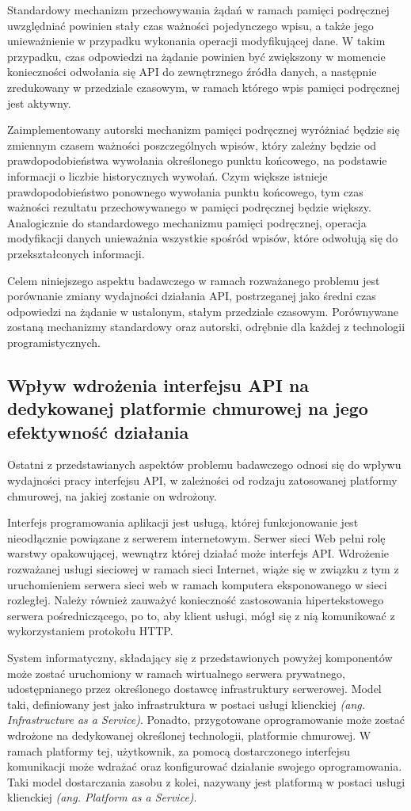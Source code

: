 Standardowy mechanizm przechowywania żądań w ramach pamięci podręcznej uwzględniać powinien stały czas ważności pojedynczego wpisu, a także jego unieważnienie w przypadku wykonania operacji modyfikującej dane. W takim przypadku, czas odpowiedzi na żądanie powinien być zwiększony w momencie konieczności odwołania się API do zewnętrznego źródła danych, a następnie zredukowany w przedziale czasowym, w ramach którego wpis pamięci podręcznej jest aktywny.

Zaimplementowany autorski mechanizm pamięci podręcznej wyróżniać będzie się zmiennym czasem ważności poszczególnych wpisów, który zależny będzie od prawdopodobieństwa wywołania określonego punktu końcowego, na podstawie informacji o liczbie historycznych wywołań. Czym większe istnieje prawdopodobieństwo ponownego wywołania punktu końcowego, tym czas ważności rezultatu przechowywanego w pamięci podręcznej będzie większy. Analogicznie do standardowego mechanizmu pamięci podręcznej, operacja modyfikacji danych unieważnia wszystkie spośród wpisów, które odwołują się do przekształconych informacji.

Celem niniejszego aspektu badawczego w ramach rozważanego problemu jest porównanie zmiany wydajności działania API, postrzeganej jako średni czas odpowiedzi na żądanie w ustalonym, stałym przedziale czasowym. Porównywane zostaną mechanizmy standardowy oraz autorski, odrębnie dla każdej z technologii programistycznych.
\subsection*{Wpływ wdrożenia interfejsu API na dedykowanej platformie chmurowej na jego efektywność działania}
Ostatni z przedstawianych aspektów problemu badawczego odnosi się do wpływu wydajności pracy interfejsu API, w zależności od rodzaju zatosowanej platformy chmurowej, na jakiej zostanie on wdrożony.

Interfejs programowania aplikacji jest usługą, której funkcjonowanie jest nieodłącznie powiązane z serwerem internetowym. Serwer sieci Web pełni rolę warstwy opakowującej, wewnątrz której działać może interfejs API. Wdrożenie rozważanej usługi sieciowej w ramach sieci Internet, wiąże się w związku z tym z uruchomieniem serwera sieci web w ramach komputera eksponowanego w sieci rozległej. Należy również zauważyć konieczność zastosowania hipertekstowego serwera pośredniczącego, po to, aby klient usługi, mógł się z nią komunikować z wykorzystaniem protokołu HTTP.

System informatyczny, składający się z przedstawionych powyżej komponentów może zostać uruchomiony w ramach wirtualnego serwera prywatnego, udostępnianego przez określonego dostawcę infrastruktury serwerowej. Model taki, definiowany jest jako infrastruktura w postaci usługi klienckiej \textit{(ang. Infrastructure as a Service)}. Ponadto, przygotowane oprogramowanie może zostać wdrożone na dedykowanej określonej technologii, platformie chmurowej. W ramach platformy tej, użytkownik, za pomocą dostarczonego interfejsu komunikacji może wdrażać oraz konfigurować działanie swojego oprogramowania. Taki model dostarczania zasobu z kolei, nazywany jest platformą w postaci usługi klienckiej \textit{(ang. Platform as a Service)}.


